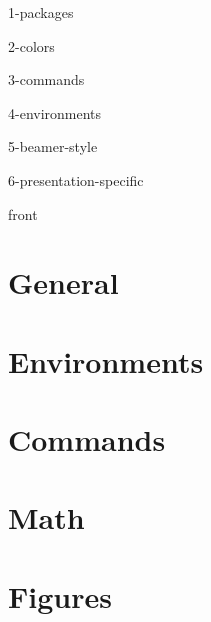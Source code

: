 \def\shareable{1}
\newcommand{\configpath}{../.config-hrg-beamer/}
\newcommand{\specificpath}{../.config-specific/}

\usepackage{import}

{1-packages}

{2-colors}

{3-commands}

{4-environments}

{5-beamer-style}

{6-presentation-specific}

{front} %

\section{General}


\section{Environments}


\section{Commands}


\section{Math}


\section{Figures}


% 

